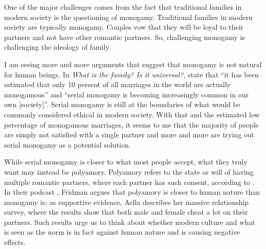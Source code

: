 \documentclass[12pt]{article}
\begin{document}
One of the major challenges comes from the fact that traditional families
in modern society is the questioning of monogamy.
Traditional families in modern society are typically monogamy.
Couples vow that they will be loyal to their partners and not have other
romantic partners.
So, challenging monogamy is challenging the ideology of family.

I am seeing more and more arguments that suggest that monogamy is not natural
for human beings.
In \textit{What is the family? Is it universal?}, \citet[p. 63]{gittins1993family}
state that ``it has been estimated that only 10 persent of all
marriages in the world are actually monogamous'' and
``serial monogamy is becoming increasingly common in our own [society]''.
Serial monogamy is still at the boundaries of what would be commonly considered
ethical in modern society.
With that and the estimated low percentage of monogamous marriages,
it seems to me that the majority of people are simply not satisfied with a
single partner and
more and more are trying out serial monogamy as a potential solution.

While serial monogamy is closer to what most people accept,
what they truly want may instead be polyamory.
Polyamory refers to the state or will of having multiple romantic partners,
where each partner has such consent, according to \cite{wikipedia2023polyamory}.
In their podcast \citep{fridman2023aella},
Fridman argues that polyamory is closer to human nature than monogamy is;
as supportive evidence, Aella describes her massive relationship survey,
where the results show that both male and female cheat a lot on their partners.
Such results urge us to think about whether modern culture and what is seen as
the norm is in fact against human nature and is causing negative effects.

\citep{schwitzgebel2008thoughts}

\citep{malinowska2022love}
\pagebreak


\end{document}

